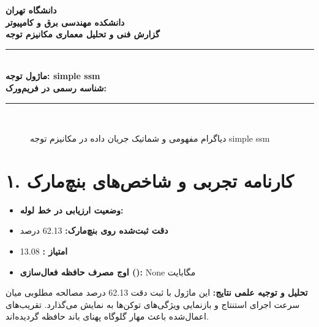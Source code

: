 \documentclass[12pt,a4paper]{article}
\begin{document}
\begin{center}
{\Large\bfseries دانشگاه تهران}\\[0.2cm]
{\large\bfseries دانشکده مهندسی برق و کامپیوتر}\\[0.2cm]
{\large\bfseries گزارش فنی و تحلیل معماری مکانیزم توجه}\\[0.5cm]
\rule{\linewidth}{1pt}\\[0.3cm]
{\LARGE\bfseries ماژول توجه: simple ssm}\\[0.2cm]
{\large \textbf{شناسه رسمی در فریم‌ورک:} }\\[0.2cm]
\rule{\linewidth}{1pt}\\[0.5cm]
\end{center}

\begin{figure}[H]
\centering
{}
\caption{دیاگرام مفهومی و شماتیک جریان داده در مکانیزم توجه simple ssm}
\end{figure}

\section*{۱. کارنامه تجربی و شاخص‌های بنچ‌مارک}
\begin{itemize}
\item \textbf{وضعیت ارزیابی در خط لوله:} 
\item \textbf{دقت ثبت‌شده روی بنچ‌مارک:} 62.13 درصد
\item \textbf{امتیاز :} 13.08
\item \textbf{اوج مصرف حافظه فعال‌سازی ():} None مگابایت
\end{itemize}
\textbf{تحلیل و توجیه علمی نتایج:} این ماژول با ثبت دقت 62.13 درصد مصالحه مطلوبی میان سرعت اجرای استنتاج و بازنمایی ویژگی‌های توکن‌ها به نمایش می‌گذارد. تقریب‌های اعمال‌شده باعث مهار گلوگاه پهنای باند حافظه گردیده‌اند.
\end{document}
